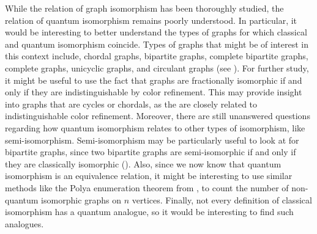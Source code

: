 \documentclass[12pt]{article}
\begin{document}
While the relation of graph isomorphism has been thoroughly studied,
the relation of quantum isomorphism remains poorly understood. In
particular, it would be interesting to better understand the types of
graphs for which classical and quantum isomorphism coincide. Types of
graphs that might be of interest in this context include, chordal
graphs, bipartite graphs, complete bipartite graphs, complete graphs,
unicyclic graphs, and circulant graphs (see \cite{bh2011}). For
further study, it might be useful to use the fact that graphs are
fractionally isomorphic if and only if they are indistinguishable by
color refinement. This may provide insight into graphs that are cycles
or chordals, as the are closely related to indistinguishable color
refinement. Moreover, there are still unanswered questions regarding
how quantum isomorphism relates to other types of isomorphism, like
semi-isomorphism. Semi-isomorphism may be particularly useful to look
at for bipartite graphs, since two bipartite graphs are
semi-isomorphic if and only if they are classically isomorphic
(\cite{rsu1994}).  Also, since we now know that quantum isomorphism is
an equivalence relation, it might be interesting to use similar
methods like the Polya enumeration theorem from \cite{b2009}, to count
the number of non-quantum isomorphic graphs on $n$ vertices. Finally,
not every definition of classical isomorphism has a quantum analogue,
so it would be interesting to find such analogues.



\end{document}
